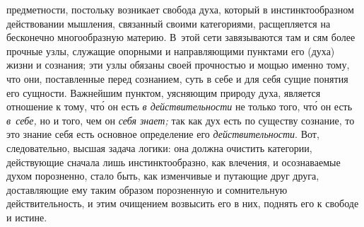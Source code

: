 предметности, постольку возникает свобода духа, который в инстинктообразном
действовании мышления, связанный своими категориями, расщепляется на бесконечно
многообразную материю. В~этой сети завязываются там и сям более прочные узлы,
служащие опорными и направляющими пунктами его (духа) жизни и сознания; эти
узлы обязаны своей прочностью и мощью именно тому, что они, поставленные перед
сознанием, суть в себе и для себя сущие понятия его сущности. Важнейшим
пунктом, уясняющим природу духа, является отношение к тому, чт\'{о} он есть
{\em в действительности} не только того, чт\'{о} он есть {\em в~себе,} но и
того, чем он {\em себя знает;} так как дух есть по существу сознание, то это
знание себя есть основное определение его {\em действительности}. Вот,
следовательно, высшая задача логики: она должна очистить категории, действующие
сначала лишь инстинктообразно, как влечения, и осознаваемые духом порозненно,
стало быть, как изменчивые и путающие друг друга, доставляющие ему таким
образом порозненную и сомнительную действительность, и этим очищением возвысить
его в них, поднять его к свободе и истине.

